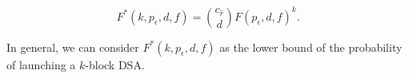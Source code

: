 \documentclass{article}
\begin{document}
\begin{equation}
    F^*(k,p_\epsilon,d,f) = \binom{c_{\hat{r}}}{d}F(p_\epsilon,d,f)^k.
\end{equation}

In general, we can consider $F^*(k,p_\epsilon,d,f)$ as the lower bound of the probability of launching a $k$-block DSA.

  

\end{document}
